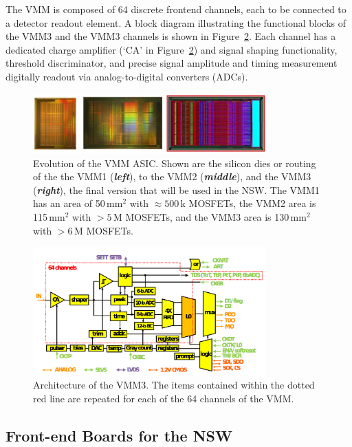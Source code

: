 The VMM is composed of 64 discrete frontend channels, each to be connected to a detector
readout element.
A block diagram illustrating the functional blocks of the VMM3 and the VMM3 channels is
shown in Figure~\ref{fig:vmm3_channel}.
Each channel has a dedicated charge amplifier (`CA' in Figure~\ref{fig:vmm3_channel}) and signal
shaping functionality,
threshold discriminator, and precise signal amplitude and timing measurement digitally readout via
analog-to-digital converters (ADCs).

\begin{figure}[!htb]
    \begin{center}
        \includegraphics[width=0.8\textwidth]{figures/nsw/vmm/vmms_silicon}
        \caption{
            Evolution of the VMM ASIC.
            Shown are the silicon dies or routing of the the VMM1 (\textbf{\textit{left}}), to the VMM2 (\textbf{\textit{middle}}), and 
            the VMM3 (\textbf{\textit{right}}), the final version that will be used in the NSW.
            The VMM1 has an area of 50\,mm$^2$ with $\approx 500$\,k MOSFETs, the VMM2 area is 115\,mm$^2$ with $>5$\,M MOSFETs,
            and the VMM3 area is 130\,mm$^2$ with $>6$\,M MOSFETs.\protect\footnotemark%
        }
        \label{fig:vmms_silicon}
    \end{center}
\end{figure}

\begin{figure}[!htb]
    \begin{center}
        \includegraphics[width=0.8\textwidth]{figures/nsw/vmm/vmm3_channel}
        \caption{
            Architecture of the VMM3.
            The items contained within the dotted red line are repeated
            for each of the 64 channels of the VMM.
        }
        \label{fig:vmm3_channel}
    \end{center}
\end{figure}

\subsection{Front-end Boards for the NSW}
\label{sec:nsw_boards}
